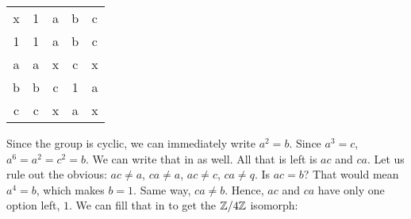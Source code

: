 \documentclass[../Main.tex]{subfiles}
\begin{document}
\begin{center}

    \begin{tabular}{ c c c c c }
    x & 1 & a & b & c \\
    1 & 1 & a & b & c \\
    a & a & x & c & x \\
    b & b & c & 1 & a \\
    c & c & x & a & x \\
    \end{tabular}
\end{center}

Since the group is cyclic, we can immediately write $a^2=b$. Since $a^3=c$, $a^6=a^2=c^2=b$. We can write that in as well. All that is left is $ac$ and $ca$. Let us rule out the obvious: $ac \neq a$, $ca \neq a$, $ac \neq c$, $ca \neq q$. Is $ac=b$? That would mean $a^4=b$, which makes $b=1$. Same way, $ca \neq b$. Hence, $ac$ and $ca$ have only one option left, $1$. We can fill that in to get the $\mathbb Z/ 4\mathbb Z$ isomorph:
\end{document}
